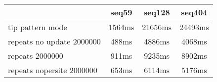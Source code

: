 \begin{tabular}{|l|c|c|c|}
\hline
 & seq59 & seq128 & seq404  \\
\hline
tip pattern mode &  1564ms &  21656ms &  24493ms\\
\hline
repeats no update 2000000 &  488ms &  4886ms &  4068ms\\
\hline
repeats 2000000 &  911ms &  9235ms &  8902ms\\
\hline
repeats nopersite 2000000 &  653ms &  6114ms &  5176ms\\
\hline
\end{tabular}
